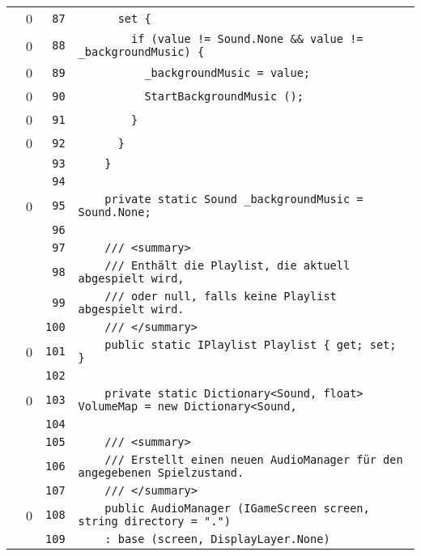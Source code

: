 \documentclass[a4paper,10pt]{article}
\begin{document}
\begin{longtable}[l]{lrrl}
\cellcolor{red} & 0 & \verb~87~ & \verb~      set {~\\
\cellcolor{red} & 0 & \verb~88~ & \verb~        if (value != Sound.None && value != _backgroundMusic) {~\\
\cellcolor{red} & 0 & \verb~89~ & \verb~          _backgroundMusic = value;~\\
\cellcolor{red} & 0 & \verb~90~ & \verb~          StartBackgroundMusic ();~\\
\cellcolor{red} & 0 & \verb~91~ & \verb~        }~\\
\cellcolor{red} & 0 & \verb~92~ & \verb~      }~\\
\cellcolor{gray} &  & \verb~93~ & \verb~    }~\\
\cellcolor{gray} &  & \verb~94~ & \verb~~\\
\cellcolor{red} & 0 & \verb~95~ & \verb~    private static Sound _backgroundMusic = Sound.None;~\\
\cellcolor{gray} &  & \verb~96~ & \verb~~\\
\cellcolor{gray} &  & \verb~97~ & \verb~    /// <summary>~\\
\cellcolor{gray} &  & \verb~98~ & \verb~    /// Enthält die Playlist, die aktuell abgespielt wird,~\\
\cellcolor{gray} &  & \verb~99~ & \verb~    /// oder null, falls keine Playlist abgespielt wird.~\\
\cellcolor{gray} &  & \verb~100~ & \verb~    /// </summary>~\\
\cellcolor{red} & 0 & \verb~101~ & \verb~    public static IPlaylist Playlist { get; set; }~\\
\cellcolor{gray} &  & \verb~102~ & \verb~~\\
\cellcolor{red} & 0 & \verb~103~ & \verb~    private static Dictionary<Sound, float> VolumeMap = new Dictionary<Sound, ~\\
\cellcolor{gray} &  & \verb~104~ & \verb~~\\
\cellcolor{gray} &  & \verb~105~ & \verb~    /// <summary>~\\
\cellcolor{gray} &  & \verb~106~ & \verb~    /// Erstellt einen neuen AudioManager für den angegebenen Spielzustand.~\\
\cellcolor{gray} &  & \verb~107~ & \verb~    /// </summary>~\\
\cellcolor{red} & 0 & \verb~108~ & \verb~    public AudioManager (IGameScreen screen, string directory = ".")~\\
\cellcolor{gray} &  & \verb~109~ & \verb~    : base (screen, DisplayLayer.None)~\\

\end{longtable}
\end{document}
